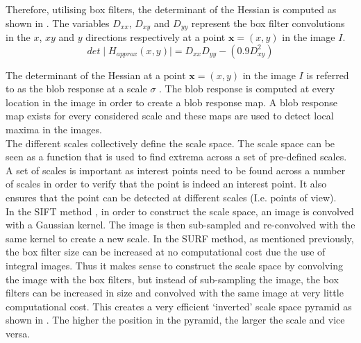 \documentclass{report}
\begin{document}
Therefore, utilising box filters, the determinant of the Hessian is computed as shown in . The variables $D_{xx}$, $D_{xy}$ and $D_{yy}$ represent the box filter convolutions in the $x$, $xy$ and $y$ directions respectively at a point $\textbf{x} = (x,y)$ in the image $I$.\\ 

\begin{equation}
det \mid H_{approx} (x,y) \mid = D_{xx}D_{yy} - (0.9 D_{xy}^2)
\label{eqn:approxHessian}
\end{equation}

The determinant of the Hessian at a point $\textbf{x} = (x,y)$ in the image $I$ is referred to as the blob response at a scale $\sigma$ \cite{Bay2008}. The blob response is computed at every location in the image in order to create a blob response map. A blob response map exists for every considered scale and these maps are used to detect local maxima in the images.\\

The different scales collectively define the scale space. The scale space can be seen as a function that is used to find extrema across a set of pre-defined scales. A set of scales is important as interest points need to be found across a number of scales in order to verify that the point is indeed an interest point. It also ensures that the point can be detected at different scales (I.e. points of view).\\

In the SIFT method \cite{Lowe2004}, in order to construct the scale space, an image is convolved with a Gaussian kernel. The image is then sub-sampled and re-convolved with the same kernel to create a new scale. In the SURF method, as mentioned previously, the box filter size can be increased at no computational cost due the use of integral images. Thus it makes sense to construct the scale space by convolving the image with the box filters, but instead of sub-sampling the image, the box filters can be increased in size and convolved with the same image at very little computational cost. This creates a very efficient `inverted' scale space pyramid as shown in  \cite{Evans2009}. The higher the position in the pyramid, the larger the scale and vice versa. \\
\end{document}
